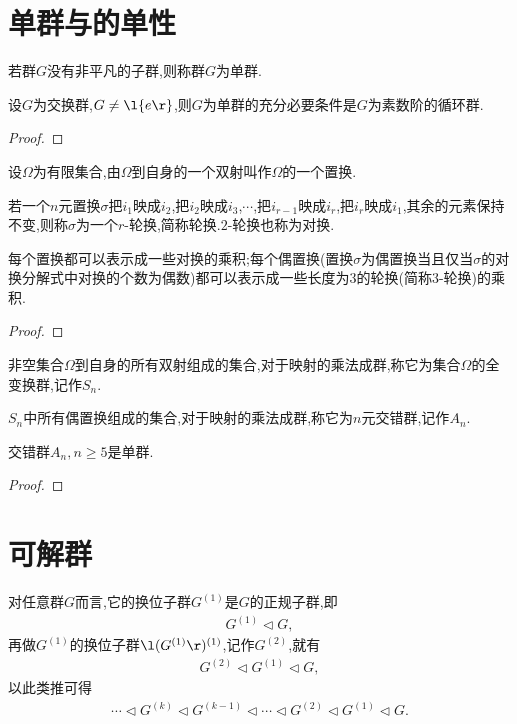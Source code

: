 \section{单群与的单性}
\begin{definition}[单群]
    若群$G$没有非平凡的子群,则称群$G$为单群.
\end{definition}
\begin{theorem}
    设$G$为交换群,$G\neq\l\{e\r\}$,则$G$为单群的充分必要条件是$G$为素数阶的循环群.
\end{theorem}
\begin{proof}
    \stars
\end{proof}
\begin{definition}[置换]
    设$\varOmega$为有限集合,由$\varOmega$到自身的一个双射叫作$\varOmega$的一个置换.
\end{definition}
\begin{definition}[轮换]
    若一个$n$元置换$\sigma$把$i_1$映成$i_2$,把$i_2$映成$i_3$,$\cdots$,把$i_{r-1}$映成$i_r$,把$i_r$映成$i_1$,其余的元素保持不变,则称$\sigma$为一个$r$-轮换,简称轮换.$2$-轮换也称为对换.
\end{definition}
\begin{lemma}
    每个置换都可以表示成一些对换的乘积;每个偶置换(置换$\sigma$为偶置换当且仅当$\sigma$的对换分解式中对换的个数为偶数)都可以表示成一些长度为$3$的轮换(简称$3$-轮换)的乘积.
\end{lemma}
\begin{proof}
    \stars
\end{proof}
\begin{definition}[全变换群]
    非空集合$\varOmega$到自身的所有双射组成的集合,对于映射的乘法成群,称它为集合$\varOmega$的全变换群,记作$S_n$.
\end{definition}
\begin{definition}[$n$元交错群]
    $S_n$中所有偶置换组成的集合,对于映射的乘法成群,称它为$n$元交错群,记作$A_n$.
\end{definition}
\begin{theorem}
    交错群$A_n,n\geq5$是单群.
\end{theorem}
\begin{proof}
    \stars
\end{proof}
\section{可解群}
对任意群$G$而言,它的换位子群$G^{(1)}$是$G$的正规子群,即\begin{align*}
    G^{(1)}\lhd G,
\end{align*}再做$G^{(1)}$的换位子群$\l(G^{(1)}\r)^{(1)}$,记作$G^{(2)}$,就有\begin{align*}
    G^{(2)}\lhd G^{(1)}\lhd G,
\end{align*}以此类推可得\begin{align*}
    \cdots\lhd G^{(k)}\lhd G^{(k-1)}\lhd\cdots\lhd G^{(2)}\lhd G^{(1)}\lhd G.
\end{align*}

